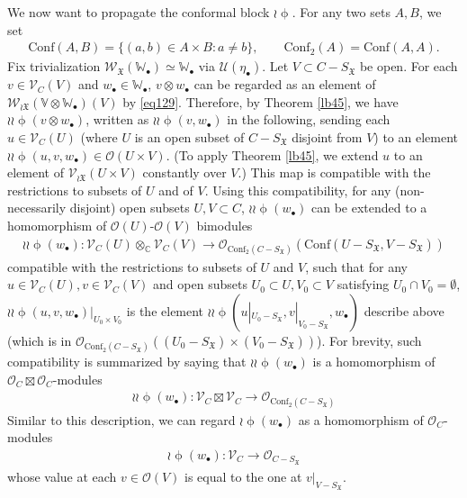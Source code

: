 \documentclass[12pt,b5paper,notitlepage]{report}
\theoremstyle{definition}
\theoremstyle{plain}
\newcommand{\fk}{\mathfrak}
\newcommand{\mc}{\mathcal}
\newcommand{\Conf}{\mathrm{Conf}}
\newcommand{\scr}{\mathscr}
\newcommand{\blt}{\bullet}
\newcommand{\Vbb}{\mathbb V}
\newcommand{\Wbb}{\mathbb W}
\newcommand{\Cbb}{\mathbb C}
\numberwithin{equation}{section}
\begin{document}
We now want to propagate the conformal block $\wr\upphi$. For any two sets $A,B$, we set \index{Conf@$\Conf$}
\begin{gather}
\Conf(A,B)=\{(a,b)\in A\times B:a\neq b\},\qquad \Conf_2(A)=\Conf(A,A).\label{eq135}
\end{gather}
Fix trivialization $\scr W_{\fk X}(\Wbb_\blt)\simeq\Wbb_\blt$ via $\mc U(\eta_\blt)$. Let $V\subset C-S_{\fk X}$ be open. For each $v\in\scr V_C(V)$ and $w_\blt\in\Wbb_\blt$, $v\otimes w_\blt$ can be regarded as an element of $\scr W_{\wr\fk X}(\Vbb\otimes\Wbb_\blt)(V)$ by \eqref{eq129}. Therefore, by Theorem \ref{lb45}, we have $\wr\wr\upphi(v\otimes w_\blt)$, written as $\wr\wr\upphi(v,w_\blt)$ in the following,  sending each $u\in\scr V_C(U)$ (where $U$ is an open subset of $C-S_{\fk X}$ disjoint from $V$) to an element $\wr\wr\upphi(u,v,w_\blt)\in\scr O(U\times V)$. (To apply Theorem \ref{lb45}, we extend $u$ to an element of $\scr V_{\wr\fk X}(U\times V)$ constantly over $V$.) This map is compatible with the restrictions to subsets of $U$ and of $V$. Using this compatibility, for any (non-necessarily disjoint) open subsets $U,V\subset C$, $\wr\wr\upphi(w_\blt)$ can be extended to a homomorphism of $\scr O(U)$-$\scr O(V)$ bimodules
\begin{align}
\wr\wr\upphi(w_\blt):\scr V_C(U)\otimes_\Cbb \scr V_C(V)\rightarrow\scr O_{\Conf_2(C-S_{\fk X})}(\Conf(U-S_{\fk X},V-S_{\fk X}))
\end{align}
compatible with the restrictions to subsets of $U$ and $V$, such that for any $u\in\scr V_C(U),v\in\scr V_C(V)$ and open subsets $U_0\subset U,V_0\subset V$ satisfying $U_0\cap V_0=\emptyset$, $\wr\wr\upphi(u,v,w_\blt)|_{U_0\times V_0}$ is the element $\wr\wr\upphi(u|_{U_0-S_{\fk X}},v|_{V_0-S_{\fk X}},w_\blt)$ describe above (which is in $\scr O_{\Conf_2(C-S_{\fk X})}((U_0-S_{\fk X})\times (V_0-S_{\fk X}))$). For brevity, such compatibility is summarized by saying that $\wr\wr\upphi(w_\blt)$ is a homomorphism of $\scr O_C\boxtimes\scr O_C$-modules
\begin{align}
\boxed{~~\wr\wr\upphi(w_\blt):\scr V_C\boxtimes\scr V_C\rightarrow\scr O_{\Conf_2(C-S_{\fk X})}~~}
\end{align}
Similar to this description, we can regard $\wr\upphi(w_\blt)$ as a homomorphism of $\scr O_C$-modules
\begin{align}
\boxed{~~\wr\upphi(w_\blt):\scr V_C\rightarrow\scr O_{C-S_{\fk X}}~~}
\end{align}
whose value at each $v\in\scr O(V)$ is equal to the one at $v|_{V-S_{\fk X}}$. 
\end{document}
